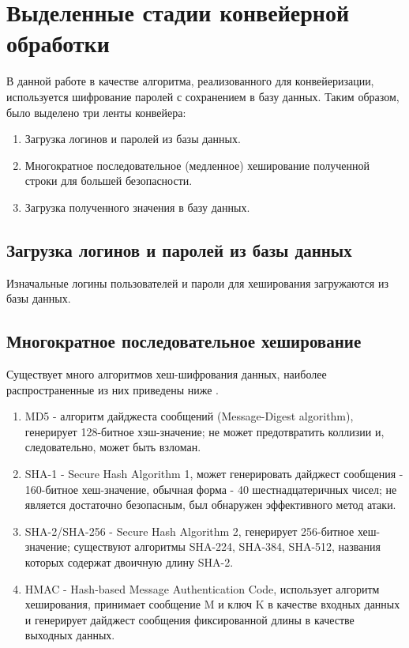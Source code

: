 \documentclass[a4paper,oneside,14pt]{extreport}
\begin{document}
\section{Выделенные стадии конвейерной обработки}
В данной работе в качестве алгоритма, реализованного для конвейеризации, используется шифрование паролей с сохранением в базу данных. Таким образом, было выделено три ленты конвейера:
\begin{enumerate}
	\item Загрузка логинов и паролей из базы данных.
	\item Многократное последовательное (медленное) хеширование полученной строки для большей безопасности.
	\item Загрузка полученного значения в базу данных.
\end{enumerate}
\subsection{Загрузка логинов и паролей из базы данных}
Изначальные логины пользователей и пароли для хеширования загружаются из базы данных.

\subsection{Многократное последовательное хеширование}
Существует много алгоритмов хеш-шифрования данных, наиболее распространенные из них приведены ниже \cite{hashes}.
\begin{enumerate}
	\item MD5 - алгоритм дайджеста сообщений (Message-Digest algorithm), генерирует 128-битное хэш-значение; не может предотвратить коллизии и, следовательно, может быть взломан.
	\item SHA-1 - Secure Hash Algorithm 1, может генерировать дайджест сообщения - 160-битное хеш-значение, обычная форма - 40 шестнадцатеричных чисел; не является достаточно безопасным, был обнаружен эффективного метод атаки.
	\item SHA-2/SHA-256 - Secure Hash Algorithm 2, генерирует 256-битное хеш-значение; существуют алгоритмы SHA-224, SHA-384, SHA-512, названия которых содержат двоичную длину SHA-2.
	\item HMAC - Hash-based Message Authentication Code, использует алгоритм хеширования, принимает сообщение M и ключ K в качестве входных данных и генерирует дайджест сообщения фиксированной длины в качестве выходных данных.
\end{enumerate}
\end{document}
